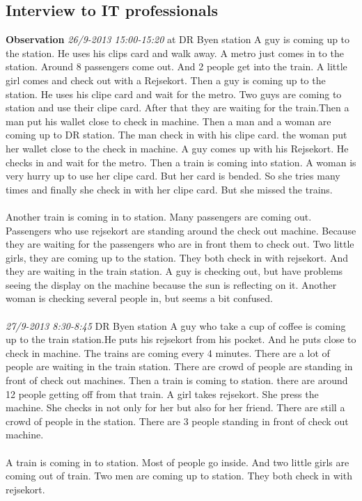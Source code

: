 \subsection*{Interview to IT professionals}
\textbf{Observation}
\textit{26/9-2013 15:00-15:20} at DR Byen station
A guy is coming up to the station. He uses his clips card and walk away. A metro just comes in to the station. Around 8 passengers come out. And 2 people get into the train. A little girl comes and check out with a Rejsekort. Then a guy is coming up to the station. He uses his clipe card and wait for the metro. Two guys are coming to station and use their clipe card. After that they are waiting for the train.Then a man put his wallet close to check in machine. Then a man and a woman are coming up to DR station. The man check in with his clipe card. the woman put her wallet close to the check in machine. 
A guy comes up with his Rejsekort. He checks in and wait for the metro. Then a train is coming into station. A woman is very hurry up to use her clipe card. But her card is bended. So she tries many times and finally she check in with her clipe card. But she missed the trains.
\\
\\
Another train is coming in to station. Many passengers are coming out. Passengers who use rejsekort are standing around the check out machine. Because they are waiting for the passengers who are in front them to check out. Two little girls, they are coming up to the station. They both check in with rejsekort. And they are waiting in the train station.
A guy is checking out, but have problems seeing the display on the machine because the sun is reflecting on it. Another woman is checking several people in, but seems a bit confused.
\\
\\
\textit{27/9-2013 8:30-8:45} DR Byen station
A guy who take a cup of coffee is coming up to the train station.He puts his rejsekort from his pocket. And he puts close to check in machine. The trains are coming every 4 minutes. There are a lot of people are waiting in the train station. There are crowd of people are standing in front of check out machines. Then a train is coming to station. there are around 12 people getting off from that train. A girl takes rejsekort. She press the machine. She checks in not only for her but also for her friend. There are still a crowd of people in the station. There are 3 people standing in front of check out machine.
\\
\\
A train is coming in to station. Most of people go inside. And two little girls are coming out of train. Two men are coming up to station. They both check in with rejsekort.

